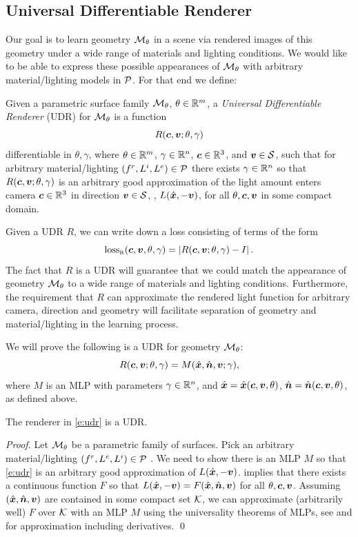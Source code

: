 \documentclass[runningheads]{llncs}
\begin{document}
\subsection{Universal Differentiable Renderer}
\label{ss:udr}
Our goal is to learn geometry ${\mathcal{M}}_\theta$ in a scene via rendered images of this geometry under a wide range of materials and lighting conditions. We would like to be able to express these possible appearances of ${\mathcal{M}}_\theta$ with arbitrary material/lighting models in ${\mathcal{P}}$. For that end we define:
%
\begin{definition}
Given a parametric surface family ${\mathcal{M}}_\theta$, $\theta\in\mathbb R^m$, a \emph{Universal Differentiable Renderer} (UDR) for ${\mathcal{M}}_\theta$ is a  function $$R({\bm{c}},{\bm{v}};\theta,\gamma)$$ differentiable in $\theta,\gamma$, where $\theta\in\mathbb R^m$, $\gamma\in\mathbb R^n$, ${\bm{c}}\in\mathbb R^3$, and ${\bm{v}}\in{\mathcal{S}}$, such that for arbitrary material/lighting $(f^r,L^i,L^e)\in {\mathcal{P}}$ there exists $\gamma\in\mathbb R^n$ so that $R({\bm{c}},{\bm{v}};\theta,\gamma)$ is an arbitrary good approximation of the light amount enters camera ${\bm{c}}\in\mathbb R^3$ in direction ${\bm{v}}\in{\mathcal{S}}$, \ie, $L({\hat{\bm{x}}},-{\bm{v}})$, for all $\theta,{\bm{c}},{\bm{v}}$ in some compact domain. 
\end{definition}
Given a UDR $R$, we can write down a loss consisting of terms of the form 
\begin{equation}\label{e:loss}
    \mathrm{loss}_{\scriptscriptstyle \mathrm{R}}({\bm{c}},{\bm{v}},\theta,\gamma)= \left\vert R({\bm{c}},{\bm{v}};\theta,\gamma) - I\right\vert.
\end{equation}
The fact that $R$ is a UDR will guarantee that we could match the appearance of geometry ${\mathcal{M}}_\theta$ to a wide range of materials and lighting conditions.  Furthermore, the requirement that $R$ can approximate the rendered light function for arbitrary camera, direction and geometry will facilitate separation of geometry and material/lighting in the learning process. 


We will prove the following is a UDR for geometry ${\mathcal{M}}_\theta$:
\begin{equation}\label{e:udr}
    R({\bm{c}},{\bm{v}};\theta,\gamma) = M({\hat{\bm{x}}},{\hat{\bm{n}}},{\bm{v}};\gamma),
\end{equation}
where $M$ is an MLP with parameters $\gamma\in\mathbb R^n$, and ${\hat{\bm{x}}}={\hat{\bm{x}}}({\bm{c}},{\bm{v}},\theta)$, ${\hat{\bm{n}}}={\hat{\bm{n}}}({\bm{c}},{\bm{v}},\theta)$, as defined above. 


%
\begin{theorem}\label{thm:udr}
The renderer in \eqref{e:udr} is a UDR.
\end{theorem}
\begin{proof}
Let ${\mathcal{M}}_\theta$ be a parametric family of surfaces. Pick an arbitrary material/lighting $(f^r,L^e,L^i)\in {\mathcal{P}}$ . We need to show there is an MLP $M$ so that \eqref{e:udr} is an arbitrary good approximation of $L({\hat{\bm{x}}},-{\bm{v}})$.  implies that there exists a continuous function $F$ so that $L({\hat{\bm{x}}},-{\bm{v}})=F({\hat{\bm{x}}},{\hat{\bm{n}}},{\bm{v}})$ for all $\theta,{\bm{c}},{\bm{v}}$.  Assuming $({\hat{\bm{x}}},{\hat{\bm{n}}},{\bm{v}})$ are contained in some compact set ${\mathcal{K}}$, we can approximate (arbitrarily well) $F$ over ${\mathcal{K}}$ with an MLP $M$ using the universality theorems of MLPs, see \cite{hornik1989multilayer} and \cite{hornik1990universal} for approximation including derivatives. \qed
\end{proof}
\end{document}

